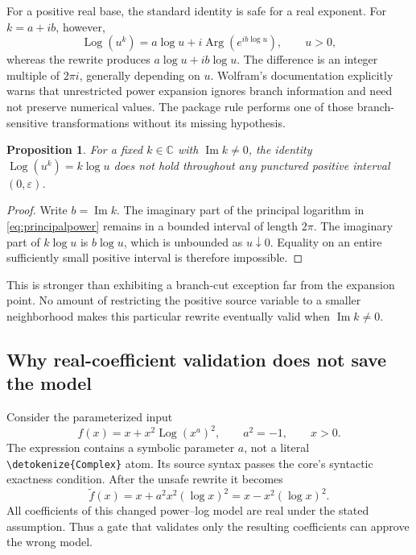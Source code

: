 \documentclass[11pt,a4paper]{article}
\newcommand{\wl}[1]{\texttt{\expandafter\nolinkurl\expandafter{\detokenize{#1}}}}
\DeclareMathOperator{\Log}{Log}
\newcommand{\CC}{\mathbb{C}}
\newtheorem{proposition}{Proposition}[section]
\begin{document}
For a positive real base, the standard identity is safe for a real exponent.
For $k=a+ib$, however,
\begin{equation}\label{eq:principalpower}
 \Log(u^k)=a\log u+i\operatorname{Arg}\!\left(e^{ib\log u}\right),
 \qquad u>0,
\end{equation}
whereas the rewrite produces $a\log u+ib\log u$.
The difference is an integer multiple of $2\pi i$, generally depending on $u$.
Wolfram's documentation explicitly warns that unrestricted power expansion
ignores branch information and need not preserve numerical values. The package
rule performs one of those branch-sensitive transformations without its missing
hypothesis.\cite{wllog,wlpowerexpand}

\begin{proposition}\label{prop:noeventual}
For a fixed $k\in\CC$ with $\operatorname{Im}k\ne0$, the identity
$\Log(u^k)=k\log u$ does not hold throughout any punctured positive interval
$(0,\varepsilon)$.
\end{proposition}
\begin{proof}
Write $b=\operatorname{Im}k$. The imaginary part of the principal logarithm in
\eqref{eq:principalpower} remains in a bounded interval of length $2\pi$.
The imaginary part of $k\log u$ is $b\log u$, which is unbounded as
$u\downarrow0$. Equality on an entire sufficiently small positive interval is
therefore impossible.
\end{proof}

This is stronger than exhibiting a branch-cut exception far from the expansion
point. No amount of restricting the positive source variable to a smaller
neighborhood makes this particular rewrite eventually valid when
$\operatorname{Im}k\ne0$.

\subsection{Why real-coefficient validation does not save the model}

Consider the parameterized input
\begin{equation}\label{eq:badsource}
 f(x)=x+x^2\Log(x^a)^2,
 \qquad a^2=-1,
 \qquad x>0.
\end{equation}
The expression contains a symbolic parameter $a$, not a literal \wl{Complex}
atom. Its source syntax passes the core's syntactic exactness condition. After
the unsafe rewrite it becomes
\[
 \widetilde f(x)=x+a^2x^2(\log x)^2
               =x-x^2(\log x)^2.
\]
All coefficients of this changed power--log model are real under the stated
assumption. Thus a gate that validates only the resulting coefficients can
approve the wrong model.\cite{core}
\end{document}
